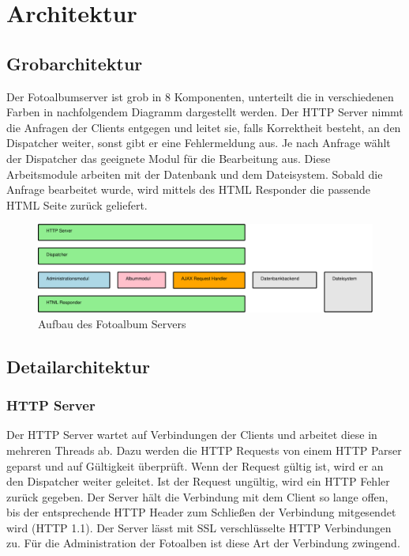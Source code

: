 \documentclass[a4paper,12pt,liststotocnumbered]{scrartcl}
\begin{document}
\section{Architektur}
\subsection{Grobarchitektur}

Der Fotoalbumserver ist grob in 8 Komponenten, unterteilt die in verschiedenen
Farben in nachfolgendem Diagramm dargestellt werden. Der HTTP Server nimmt die
Anfragen der Clients entgegen und leitet sie, falls Korrektheit besteht, an
den Dispatcher weiter, sonst gibt er eine Fehlermeldung aus. Je nach Anfrage
wählt der Dispatcher das geeignete Modul für die Bearbeitung aus. Diese
Arbeitsmodule arbeiten mit der Datenbank und dem Dateisystem.  Sobald die
Anfrage bearbeitet wurde, wird mittels des HTML Responder die passende HTML
Seite zurück geliefert.

\begin{figure}[h]
	\begin{center}
		\includegraphics[width=\textwidth]{grobarchitektur}
		\caption{Aufbau des Fotoalbum Servers}
		\label{grobarchitektur}
	\end{center}
\end{figure}

\subsection{Detailarchitektur}

\subsubsection{HTTP Server}

Der HTTP Server wartet auf Verbindungen der Clients und arbeitet diese in
mehreren Threads ab. Dazu werden die HTTP Requests von einem HTTP Parser
geparst und auf Gültigkeit überprüft. Wenn der Request gültig ist, wird er an
den Dispatcher weiter geleitet. Ist der Request ungültig, wird ein HTTP Fehler
zurück gegeben. Der Server hält die Verbindung mit dem Client so lange offen,
bis der entsprechende HTTP Header zum Schließen der Verbindung mitgesendet
wird (HTTP 1.1). Der Server lässt mit SSL verschlüsselte HTTP Verbindungen zu.
Für die Administration der Fotoalben ist diese Art der Verbindung zwingend.
\end{document}
